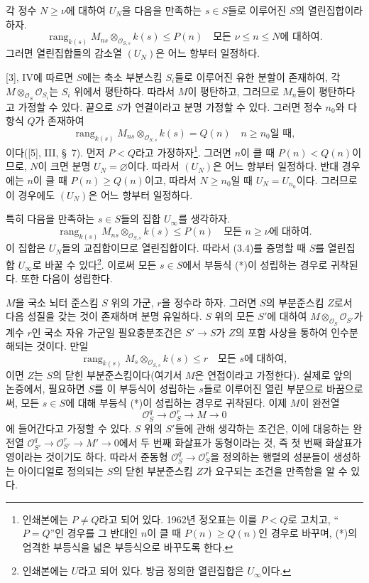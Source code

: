  각 정수 $N\geq\nu$에 대하여 $U_N$을 다음을
만족하는 $s\in S$들로 이루어진 $S$의 열린집합이라 하자.
\[
\operatorname{rang}_{k(s)}
M_{ns}\otimes_{\mathcal O_{S,s}}k(s)\leq P(n)
\quad\text{모든 $\nu\leq n\leq N$에 대하여}.
\]
그러면 열린집합들의 감소열 $(U_N)$은 어느 항부터 일정하다.

[3], IV에 따르면 $S$에는 축소 부분스킴 $S_i$들로 이루어진 유한 분할이
존재하여, 각 $M\otimes_{\mathcal O_S}\mathcal O_{S_i}$는 $S_i$ 위에서
평탄하다. 따라서 $M$이 평탄하고, 그러므로 $M_n$들이 평탄하다고 가정할
수 있다. 끝으로 $S$가 연결이라고 분명 가정할 수 있다. 그러면 정수
$n_0$와 다항식 $Q$가 존재하여
\[
\operatorname{rang}_{k(s)}
M_{ns}\otimes_{\mathcal O_{S,s}}k(s)=Q(n)
\quad\text{$n\geq n_0$일 때},
\]
이다([5], III, \S~7). 먼저 $P<Q$라고 가정하자\footnote{인쇄본에는
$P\neq Q$라고 되어 있다. 1962년 정오표는 이를 $P<Q$로 고치고,
``$P=Q$''인 경우를 그 반대인 $n$이 클 때 $P(n)\geq Q(n)$인 경우로
바꾸며, (*)의 엄격한 부등식을 넓은 부등식으로 바꾸도록 한다.}. 그러면
$n$이 클 때 $P(n)<Q(n)$이므로, $N$이 크면 분명
$U_N=\varnothing$이다. 따라서 $(U_N)$은 어느 항부터 일정하다. 반대
경우에는 $n$이 클 때 $P(n)\geq Q(n)$이고, 따라서 $N\geq n_0$일 때
$U_N=U_{n_0}$이다. 그러므로 이 경우에도 $(U_N)$은 어느 항부터 일정하다.

특히 다음을 만족하는 $s\in S$들의 집합 $U_\infty$를 생각하자.
\[
\tag{*}
\operatorname{rang}_{k(s)}
M_{ns}\otimes_{\mathcal O_{S,s}}k(s)\leq P(n)
\quad\text{모든 $n\geq\nu$에 대하여}.
\]
이 집합은 $U_N$들의 교집합이므로 열린집합이다. 따라서 (3.4)를 증명할
때 $S$를 열린집합 $U_\infty$로 바꿀 수 있다\footnote{인쇄본에는 $U$라고 되어 있다. 방금 정의한 열린집합은 $U_\infty$이다.}.
이로써 모든 $s\in S$에서 부등식 (*)이 성립하는 경우로 귀착된다. 또한
다음이 성립한다.

 $M$을 국소 뇌터 준스킴 $S$ 위의 가군, $r$을
정수라 하자. 그러면 $S$의 부분준스킴 $Z$로서 다음 성질을 갖는 것이
존재하며 분명 유일하다. $S$ 위의 모든 $S'$에 대하여
$M\otimes_{\mathcal O_S}\mathcal O_{S'}$가 계수 $r$인 국소 자유 가군일
필요충분조건은 $S'\longrightarrow S$가 $Z$의 포함 사상을 통하여
인수분해되는 것이다. 만일
\[
\operatorname{rang}_{k(s)}
M_s\otimes_{\mathcal O_{S,s}}k(s)\leq r
\quad\text{모든 $s$에 대하여},
\]
이면 $Z$는 $S$의 닫힌 부분준스킴이다(여기서 $M$은 연접이라고
가정한다).
실제로 앞의 논증에서, 필요하면 $S$를 이 부등식이 성립하는 $s$들로
이루어진 열린 부분으로 바꿈으로써, 모든 $s\in S$에 대해 부등식 (*)이
성립하는 경우로 귀착된다. 이제 $M$이 완전열
\[
\mathcal O_S^q\longrightarrow\mathcal O_S^r\longrightarrow M\longrightarrow0
\]
에 들어간다고 가정할 수 있다. $S$ 위의 $S'$들에 관해 생각하는 조건은,
이에 대응하는 완전열
$\mathcal O_{S'}^q\longrightarrow\mathcal O_{S'}^r
\longrightarrow M'\longrightarrow0$에서 두 번째 화살표가 동형이라는 것,
즉 첫 번째 화살표가 영이라는 것이기도 하다. 따라서 준동형
$\mathcal O_S^q\longrightarrow\mathcal O_S^r$을 정의하는 행렬의 성분들이
생성하는 아이디얼로 정의되는 $S$의 닫힌 부분준스킴 $Z$가 요구되는
조건을 만족함을 알 수 있다.

